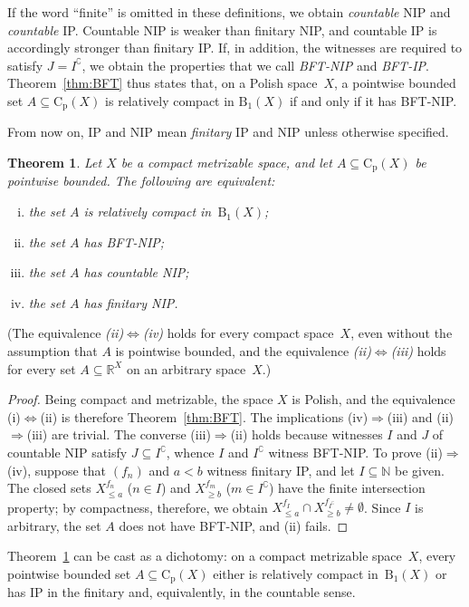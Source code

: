 \documentclass[psamsfonts]{amsart}
\newtheorem{thm}{Theorem}[section]
\theoremstyle{definition}
\theoremstyle{remark}
\newcommand{\Cp}{\mathrm{C}_{\mathrm{p}}}
\numberwithin{equation}{section}
\begin{document}
If the word “finite” is omitted in these definitions, we obtain \emph{countable} NIP and \emph{countable} IP.
Countable NIP is weaker than finitary NIP, and countable IP is accordingly stronger than finitary IP.
If, in addition, the witnesses are required to satisfy $J = I^{\complement}$, we obtain the properties that we call \emph{BFT-NIP} and \emph{BFT-IP}.
Theorem~\ref{thm:BFT} thus states that, on a Polish space~$X$, a pointwise bounded set $A\subseteq \Cp(X)$ is relatively compact in $\mathrm{B}_1(X)$ if and only if it has BFT-NIP.

From now on, IP and NIP mean \emph{finitary} IP and NIP unless otherwise specified.

\begin{thm}
  \label{thm:BFT2}
  Let $X$ be a compact metrizable space, and let $A\subseteq \Cp(X)$ be pointwise bounded.
  The following are equivalent:
  \begin{enumerate}[(i)]
  \item
    the set $A$ is relatively compact in~$\mathrm{B}_1(X)$;
  \item
    the set $A$ has BFT-NIP;
  \item
    the set $A$ has countable NIP;
  \item
    the set $A$ has finitary NIP.
  \end{enumerate}
\end{thm}
(The equivalence \emph{(ii)}$\Leftrightarrow$\emph{(iv)} holds for every compact space~$X$, even without the assumption that $A$ is pointwise bounded, and the equivalence \emph{(ii)}$\Leftrightarrow$\emph{(iii)} holds for every set $A\subseteq\mathbb{R}^X$ on an arbitrary space~$X$.)
\begin{proof}
  Being compact and metrizable, the space $X$ is Polish, and the equivalence (i)$\Leftrightarrow$(ii) is therefore Theorem~\ref{thm:BFT}.
  The implications (iv)$\Rightarrow$(iii) and (ii)$\Rightarrow$(iii) are trivial.
  The converse (iii)$\Rightarrow$(ii) holds because witnesses $I$ and $J$ of countable NIP satisfy $J\subseteq I^{\complement}$, whence $I$ and $I^{\complement}$ witness BFT-NIP.
  To prove (ii)$\Rightarrow$(iv), suppose that $(f_n)$ and $a<b$ witness finitary IP, and let $I\subseteq\mathbb{N}$ be given.
  The closed sets $X^{f_n}_{\le a}$ ($n\in I$) and $X^{f_m}_{\ge b}$ ($m\in I^{\complement}$) have the finite intersection property; by compactness, therefore, we obtain $X^{f_I}_{\le a}\cap X^{f_{I^{\complement}}}_{\ge b}\neq\emptyset$.
  Since $I$ is arbitrary, the set $A$ does not have BFT-NIP, and (ii) fails.
\end{proof}
Theorem~\ref{thm:BFT2} can be cast as a dichotomy: on a compact metrizable space~$X$, every pointwise bounded set $A\subseteq\Cp(X)$ either is relatively compact in~$\mathrm{B}_1(X)$ or has IP in the finitary and, equivalently, in the countable sense.
\end{document}
